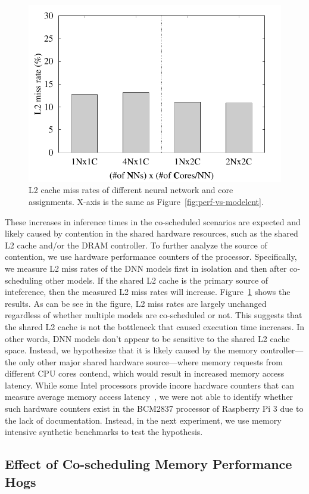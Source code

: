 \begin{figure}[h]
  \centering
  \includegraphics[width=.45\textwidth]{figs/l2missrate_vs_modelcnt}
  \caption{L2 cache miss rates of different neural network and core
    assignments. X-axis is the same as Figure~\ref{fig:perf-vs-modelcnt}.} 
  \label{fig:l2missrate-vs-modelcnt}
\end{figure}

These increases in inference times in the co-scheduled scenarios are
expected and likely caused by contention in the shared hardware
resources, such as the shared L2 cache and/or the DRAM controller.
To further analyze the source of contention, we use hardware
performance counters of the processor. Specifically, we measure L2
miss rates of the DNN models first in isolation and then after
co-scheduling other models. If the shared L2 cache is the primary
source of inteference, then the measured L2 miss rates will
increase. Figure~\ref{fig:l2missrate-vs-modelcnt} shows the results.
As can be see in the figure, L2 miss rates are largely unchanged
regardless of whether multiple models are co-scheduled or not. This
suggests that the shared L2 cache is not the bottleneck that caused
execution time increases. In other words, DNN models don't appear to be
sensitive to the shared L2 cache space. %
Instead, we hypothesize that it is likely caused by the memory
controller---the only other major shared hardware source---where
memory requests from different CPU cores contend, which would result
in increased memory access latency. While some Intel processors
provide incore hardware counters that can measure average memory
access latency~\cite{ye2016maracas}, we were not able to identify
whether such hardware counters exist in the BCM2837 processor of
Raspberry Pi 3 due to the lack of documentation. Instead, in the next
experiment, we use memory intensive synthetic benchmarks to test the
hypothesis.

\subsection{Effect of Co-scheduling Memory Performance Hogs}\label{sec:eval-memhog}

